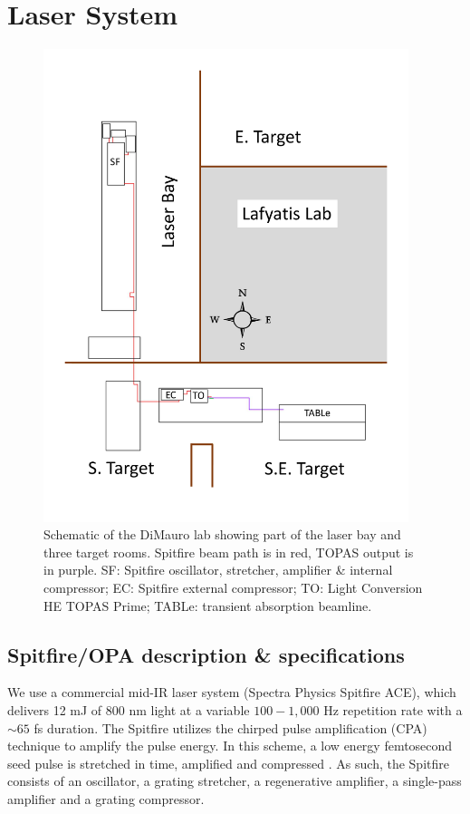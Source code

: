 \section{Laser System}

\begin{figure}
	\centering
	\includegraphics[width=0.95\textwidth]{figures/chap2/beam_routing.pdf}
	\caption{Schematic of the DiMauro lab showing part of the laser bay and three target rooms. Spitfire beam path is in red, TOPAS output is in purple. SF: Spitfire oscillator, stretcher, amplifier \& internal compressor; EC: Spitfire external compressor; TO: Light Conversion HE TOPAS Prime; TABLe: transient absorption beamline.}
	\label{fig:beam_routing}
\end{figure}

\subsection{Spitfire/OPA description \& specifications}

We use a commercial mid-IR laser system (Spectra Physics Spitfire ACE), which delivers 12 mJ of 800 nm light at a variable $100 - 1,000$ Hz repetition rate with a $\sim65$ fs duration. The Spitfire utilizes the chirped pulse amplification (CPA) technique to amplify the pulse energy. In this scheme, a low energy femtosecond seed pulse is stretched in time, amplified and compressed \cite{stricklandCompressionAmplifiedChirped1985}. As such, the Spitfire consists of an oscillator, a grating stretcher, a regenerative amplifier, a single-pass amplifier and a grating compressor.

